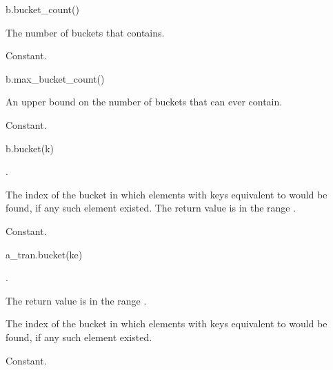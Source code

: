 %
\begin{itemdecl}
b.bucket_count()
\end{itemdecl}

\begin{itemdescr}
\pnum
\result
{}

\pnum
\returns
The number of buckets that  contains.

\pnum
\complexity
Constant.
\end{itemdescr}

%
\begin{itemdecl}
b.max_bucket_count()
\end{itemdecl}

\begin{itemdescr}
\pnum
\result
{}

\pnum
\returns
An upper bound on the number of buckets that  can ever contain.

\pnum
\complexity
Constant.
\end{itemdescr}

%
\begin{itemdecl}
b.bucket(k)
\end{itemdecl}

\begin{itemdescr}
\pnum
\result
{}

\pnum
\expects
{}.

\pnum
\returns
The index of the bucket
in which elements with keys equivalent to  would be found,
if any such element existed.
The return value is in the range .

\pnum
\complexity
Constant.
\end{itemdescr}

%
\begin{itemdecl}
a_tran.bucket(ke)
\end{itemdecl}

\begin{itemdescr}
\pnum
\result
{}

\pnum
\expects
{}.

\pnum
\ensures
The return value is in the range .

\pnum
\returns
The index of the bucket
in which elements with keys equivalent to  would be found,
if any such element existed.

\pnum
\complexity
Constant.
\end{itemdescr}

